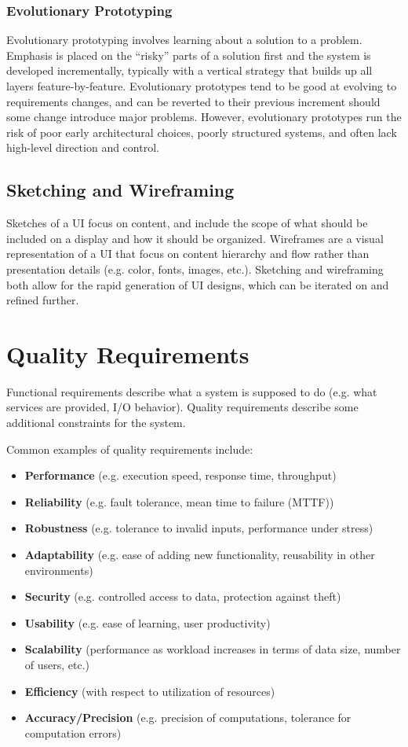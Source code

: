 \documentclass[12pt,titlepage]{article}
\let\stdsection\section
\renewcommand\section{\clearpage\stdsection}
\begin{document}
      \subsubsection{Evolutionary Prototyping}
        Evolutionary prototyping involves learning about a solution to a problem. Emphasis is placed on the ``risky'' parts of a solution first and the system is developed incrementally,
        typically with a vertical strategy that builds up all layers feature-by-feature. Evolutionary prototypes tend to be good at evolving to requirements changes, and can be
        reverted to their previous increment should some change introduce major problems. However, evolutionary prototypes run the risk of poor early architectural choices, poorly
        structured systems, and often lack high-level direction and control.

      \subsection{Sketching and Wireframing}
        Sketches of a UI focus on content, and include the scope of what should be included on a display and how it should be organized. Wireframes are a visual representation of a UI
        that focus on content hierarchy and flow rather than presentation details (e.g. color, fonts, images, etc.). Sketching and wireframing both allow for the rapid generation of
        UI designs, which can be iterated on and refined further.

  \section{Quality Requirements}
    Functional requirements describe what a system is supposed to do (e.g. what services are provided, I/O behavior). Quality requirements describe some
    additional constraints for the system.

    Common examples of quality requirements include:
    \begin{itemize}
      \item \textbf{Performance} (e.g. execution speed, response time, throughput)
      \item \textbf{Reliability} (e.g. fault tolerance, mean time to failure (MTTF))
      \item \textbf{Robustness} (e.g. tolerance to invalid inputs, performance under stress)
      \item \textbf{Adaptability} (e.g. ease of adding new functionality, reusability in other environments)
      \item \textbf{Security} (e.g. controlled access to data, protection against theft)
      \item \textbf{Usability} (e.g. ease of learning, user productivity)
      \item \textbf{Scalability} (performance as workload increases in terms of data size, number of users, etc.)
      \item \textbf{Efficiency} (with respect to utilization of resources)
      \item \textbf{Accuracy/Precision} (e.g. precision of computations, tolerance for computation errors)
    \end{itemize}
\end{document}
